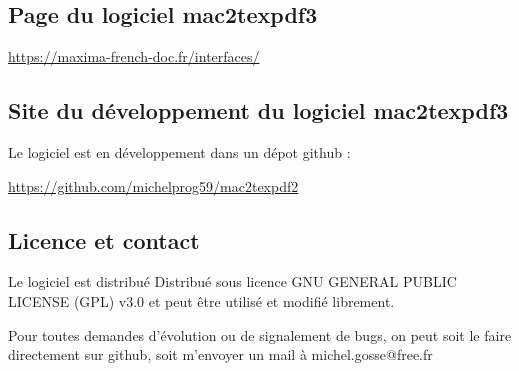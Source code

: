 \documentclass[a4paper, 11pt]{article}
\begin{document}
\subsection*{Page du logiciel mac2texpdf3}
\href{https://maxima-french-doc.fr/interfaces/}{https://maxima-french-doc.fr/interfaces/}

\subsection*{Site du développement du logiciel mac2texpdf3}
Le logiciel est en développement dans un dépot github :

\href{https://github.com/michelprog59/mac2texpdf2}{https://github.com/michelprog59/mac2texpdf2}

\subsection*{Licence et contact}
Le logiciel est distribué Distribué sous licence GNU GENERAL PUBLIC LICENSE (GPL) v3.0 et peut être utilisé et modifié librement.

Pour toutes demandes d'évolution ou de signalement de bugs, on peut soit le faire directement sur github, soit m'envoyer un mail à michel.gosse@free.fr
\end{document}
